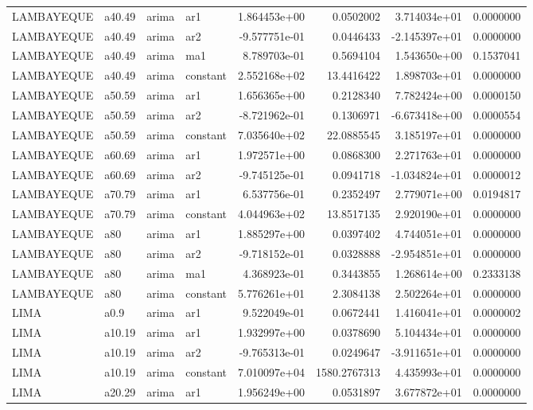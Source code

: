 \documentclass[
]{article}
\begin{document}
\begin{table}[!h]
\begin{tabular}[t]{llllrrrr}
\addlinespace
LAMBAYEQUE & a40.49 & arima & ar1 & 1.864453e+00 & 0.0502002 & 3.714034e+01 & 0.0000000\\
LAMBAYEQUE & a40.49 & arima & ar2 & -9.577751e-01 & 0.0446433 & -2.145397e+01 & 0.0000000\\
LAMBAYEQUE & a40.49 & arima & ma1 & 8.789703e-01 & 0.5694104 & 1.543650e+00 & 0.1537041\\
LAMBAYEQUE & a40.49 & arima & constant & 2.552168e+02 & 13.4416422 & 1.898703e+01 & 0.0000000\\
LAMBAYEQUE & a50.59 & arima & ar1 & 1.656365e+00 & 0.2128340 & 7.782424e+00 & 0.0000150\\
\addlinespace
LAMBAYEQUE & a50.59 & arima & ar2 & -8.721962e-01 & 0.1306971 & -6.673418e+00 & 0.0000554\\
LAMBAYEQUE & a50.59 & arima & constant & 7.035640e+02 & 22.0885545 & 3.185197e+01 & 0.0000000\\
LAMBAYEQUE & a60.69 & arima & ar1 & 1.972571e+00 & 0.0868300 & 2.271763e+01 & 0.0000000\\
LAMBAYEQUE & a60.69 & arima & ar2 & -9.745125e-01 & 0.0941718 & -1.034824e+01 & 0.0000012\\
LAMBAYEQUE & a70.79 & arima & ar1 & 6.537756e-01 & 0.2352497 & 2.779071e+00 & 0.0194817\\
\addlinespace
LAMBAYEQUE & a70.79 & arima & constant & 4.044963e+02 & 13.8517135 & 2.920190e+01 & 0.0000000\\
LAMBAYEQUE & a80 & arima & ar1 & 1.885297e+00 & 0.0397402 & 4.744051e+01 & 0.0000000\\
LAMBAYEQUE & a80 & arima & ar2 & -9.718152e-01 & 0.0328888 & -2.954851e+01 & 0.0000000\\
LAMBAYEQUE & a80 & arima & ma1 & 4.368923e-01 & 0.3443855 & 1.268614e+00 & 0.2333138\\
LAMBAYEQUE & a80 & arima & constant & 5.776261e+01 & 2.3084138 & 2.502264e+01 & 0.0000000\\
\addlinespace
LIMA & a0.9 & arima & ar1 & 9.522049e-01 & 0.0672441 & 1.416041e+01 & 0.0000002\\
LIMA & a10.19 & arima & ar1 & 1.932997e+00 & 0.0378690 & 5.104434e+01 & 0.0000000\\
LIMA & a10.19 & arima & ar2 & -9.765313e-01 & 0.0249647 & -3.911651e+01 & 0.0000000\\
LIMA & a10.19 & arima & constant & 7.010097e+04 & 1580.2767313 & 4.435993e+01 & 0.0000000\\
LIMA & a20.29 & arima & ar1 & 1.956249e+00 & 0.0531897 & 3.677872e+01 & 0.0000000\\

\end{tabular}
\end{table}
\end{document}
